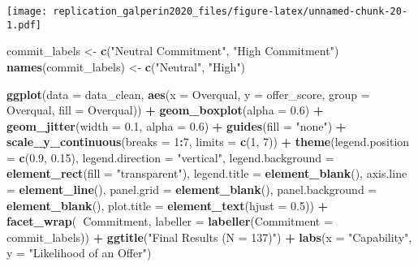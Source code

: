 \documentclass[]{article}
\newenvironment{Shaded}{\begin{snugshade}}{\end{snugshade}}
\newcommand{\DataTypeTok}[1]{\textcolor[rgb]{0.13,0.29,0.53}{#1}}
\newcommand{\DecValTok}[1]{\textcolor[rgb]{0.00,0.00,0.81}{#1}}
\newcommand{\FloatTok}[1]{\textcolor[rgb]{0.00,0.00,0.81}{#1}}
\newcommand{\KeywordTok}[1]{\textcolor[rgb]{0.13,0.29,0.53}{\textbf{#1}}}
\newcommand{\NormalTok}[1]{#1}
\newcommand{\OperatorTok}[1]{\textcolor[rgb]{0.81,0.36,0.00}{\textbf{#1}}}
\newcommand{\StringTok}[1]{\textcolor[rgb]{0.31,0.60,0.02}{#1}}
\begin{document}
\texttt{[image: replication\_galperin2020\_files/figure-latex/unnamed-chunk-20-1.pdf]}

\begin{Shaded}
\begin{Highlighting}[]
\NormalTok{commit_labels <-}\StringTok{ }\KeywordTok{c}\NormalTok{(}\StringTok{"Neutral Commitment"}\NormalTok{, }\StringTok{"High Commitment"}\NormalTok{)}
\KeywordTok{names}\NormalTok{(commit_labels) <-}\StringTok{ }\KeywordTok{c}\NormalTok{(}\StringTok{"Neutral"}\NormalTok{, }\StringTok{"High"}\NormalTok{)}

\KeywordTok{ggplot}\NormalTok{(}\DataTypeTok{data =}\NormalTok{ data_clean, }\KeywordTok{aes}\NormalTok{(}\DataTypeTok{x =}\NormalTok{ Overqual, }\DataTypeTok{y =}\NormalTok{ offer_score, }\DataTypeTok{group =}\NormalTok{ Overqual, }\DataTypeTok{fill =}\NormalTok{ Overqual)) }\OperatorTok{+}
\StringTok{  }\KeywordTok{geom_boxplot}\NormalTok{(}\DataTypeTok{alpha =} \FloatTok{0.6}\NormalTok{) }\OperatorTok{+}
\StringTok{  }\KeywordTok{geom_jitter}\NormalTok{(}\DataTypeTok{width =} \FloatTok{0.1}\NormalTok{, }\DataTypeTok{alpha =} \FloatTok{0.6}\NormalTok{) }\OperatorTok{+}
\StringTok{  }\KeywordTok{guides}\NormalTok{(}\DataTypeTok{fill =} \StringTok{"none"}\NormalTok{) }\OperatorTok{+}
\StringTok{  }\KeywordTok{scale_y_continuous}\NormalTok{(}\DataTypeTok{breaks =} \DecValTok{1}\OperatorTok{:}\DecValTok{7}\NormalTok{, }\DataTypeTok{limits =} \KeywordTok{c}\NormalTok{(}\DecValTok{1}\NormalTok{, }\DecValTok{7}\NormalTok{)) }\OperatorTok{+}
\StringTok{  }\KeywordTok{theme}\NormalTok{(}\DataTypeTok{legend.position =} \KeywordTok{c}\NormalTok{(}\FloatTok{0.9}\NormalTok{, }\FloatTok{0.15}\NormalTok{),}
        \DataTypeTok{legend.direction =} \StringTok{"vertical"}\NormalTok{,}
        \DataTypeTok{legend.background =} \KeywordTok{element_rect}\NormalTok{(}\DataTypeTok{fill =} \StringTok{"transparent"}\NormalTok{),}
        \DataTypeTok{legend.title =} \KeywordTok{element_blank}\NormalTok{(),}
        \DataTypeTok{axis.line =} \KeywordTok{element_line}\NormalTok{(),}
        \DataTypeTok{panel.grid =} \KeywordTok{element_blank}\NormalTok{(), }
        \DataTypeTok{panel.background =} \KeywordTok{element_blank}\NormalTok{(),}
        \DataTypeTok{plot.title =} \KeywordTok{element_text}\NormalTok{(}\DataTypeTok{hjust =} \FloatTok{0.5}\NormalTok{)) }\OperatorTok{+}
\StringTok{  }\KeywordTok{facet_wrap}\NormalTok{(}\OperatorTok{~}\NormalTok{Commitment, }\DataTypeTok{labeller =} \KeywordTok{labeller}\NormalTok{(}\DataTypeTok{Commitment =}\NormalTok{ commit_labels)) }\OperatorTok{+}
\StringTok{  }\KeywordTok{ggtitle}\NormalTok{(}\StringTok{"Final Results (N = 137)"}\NormalTok{) }\OperatorTok{+}
\StringTok{  }\KeywordTok{labs}\NormalTok{(}\DataTypeTok{x =} \StringTok{"Capability"}\NormalTok{, }\DataTypeTok{y =} \StringTok{"Likelihood of an Offer"}\NormalTok{)}
\end{Highlighting}
\end{Shaded}
\end{document}
